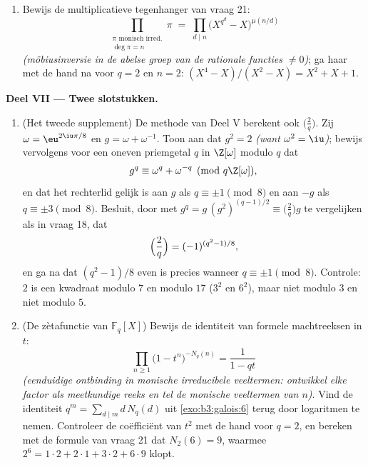 \begin{problem}
\begin{enumerate}[resume]
        en $n \leq 4$ (\cref{exo:b3:galois:6} geeft de
        aantallen).
  \item Bewijs de multiplicatieve tegenhanger van vraag 21:
        \[
        \prod_{\substack{\pi \text{ monisch irred.}\\ \deg\pi =
        n}}\pi \;=\; \prod_{d \mid n}
        \bigl(X^{q^d} - X\bigr)^{\mu(n/d)}
        \]
        \emph{(möbiusinversie in de abelse groep van de rationale
        functies $\neq 0$)}; ga haar met de hand na voor $q = 2$
        en $n = 2$: $(X^4 - X)/(X^2 - X) = X^2 + X + 1$.
\end{enumerate}

\medskip
\noindent\textbf{Deel VII --- Twee slotstukken.}
\begin{enumerate}[resume]
  \item (Het tweede supplement) De methode van Deel V berekent ook
        $\bigl(\frac2q\bigr)$. Zij $\omega = \eu^{2\iu\pi/8}$ en
        $g = \omega + \omega^{-1}$. Toon aan dat $g^2 = 2$
        \emph{(want $\omega^2 = \iu$)}; bewijs vervolgens voor een
        oneven priemgetal $q$ in $\Z[\omega]$ modulo $q$ dat
        \[
        g^q \equiv \omega^q + \omega^{-q} \pmod{q\Z[\omega]},
        \]
        en dat het rechterlid gelijk is aan $g$ als $q \equiv \pm1
        \pmod 8$ en aan $-g$ als $q \equiv \pm3 \pmod 8$. Besluit,
        door met $g^q = g\,(g^2)^{(q-1)/2} \equiv
        \bigl(\frac2q\bigr)g$ te vergelijken als in vraag 18, dat
        \[
        \Bigl(\frac2q\Bigr) = (-1)^{(q^2-1)/8},
        \]
        en ga na dat $(q^2 - 1)/8$ even is precies wanneer $q
        \equiv \pm1 \pmod 8$. Controle: $2$ is een kwadraat modulo
        $7$ en modulo $17$ ($3^2$ en $6^2$), maar niet modulo $3$
        en niet modulo $5$.
  \item (De zètafunctie van $\mathbb F_q[X]$) Bewijs de identiteit
        van formele machtreeksen in $t$:
        \[
        \prod_{n \geq 1}\bigl(1 - t^n\bigr)^{-N_q(n)}
        = \frac1{1 - qt}
        \]
        \emph{(eenduidige ontbinding in monische irreducibele
        veeltermen: ontwikkel elke factor als meetkundige reeks en
        tel de monische veeltermen van  $n$)}. Vind de
        identiteit $q^m = \sum_{d \mid m}d\,N_q(d)$ uit
        \cref{exo:b3:galois:6} terug door logaritmen te nemen.
        Controleer de coëfficiënt van $t^2$ met de hand voor $q =
        2$, en bereken met de formule van vraag 21 dat $N_2(6) =
        9$, waarmee $2^6 = 1\cdot2 + 2\cdot1 + 3\cdot2 + 6\cdot9$
        klopt.
\end{enumerate}
\end{problem}
